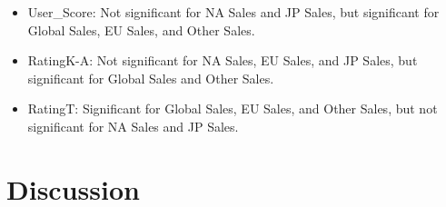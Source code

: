 \documentclass[12pt]{article}
\begin{document}
\begin{itemize}
    \item User\_Score: Not significant for NA Sales and JP Sales, but significant for Global Sales, EU Sales, and Other Sales.

    \item RatingK-A: Not significant for NA Sales, EU Sales, and JP Sales, but significant for Global Sales and Other Sales.

    \item RatingT: Significant for Global Sales, EU Sales, and Other Sales, but not significant for NA Sales and JP Sales.
\end{itemize}


\section{Discussion}
\label{sec:disc}
\end{document}
